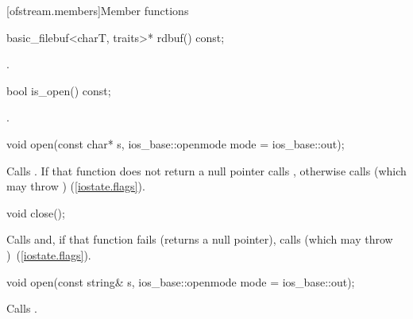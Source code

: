 [ofstream.members]{Member functions}

%
\begin{itemdecl}
basic_filebuf<charT, traits>* rdbuf() const;
\end{itemdecl}

\begin{itemdescr}
\pnum
\returns
{}.
\end{itemdescr}

%
\begin{itemdecl}
bool is_open() const;
\end{itemdecl}

\begin{itemdescr}
\pnum
\returns
{}.
\end{itemdescr}

%
\begin{itemdecl}
void open(const char* s, ios_base::openmode mode = ios_base::out);
\end{itemdecl}

\begin{itemdescr}
\pnum
\effects
Calls
.
If that function does not return a null pointer
calls ,
otherwise calls
(which may throw
) (\ref{iostate.flags}).
\end{itemdescr}

%
\begin{itemdecl}
void close();
\end{itemdecl}

\begin{itemdescr}
\pnum
\effects
Calls
and, if that function fails (returns a null pointer), calls
(which may throw
)~(\ref{iostate.flags}).
\end{itemdescr}

%
\begin{itemdecl}
void open(const string& s, ios_base::openmode mode = ios_base::out);
\end{itemdecl}

\begin{itemdescr}
\pnum
\effects Calls .
\end{itemdescr}

